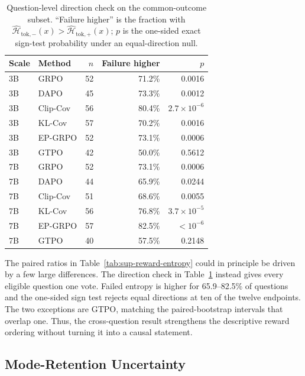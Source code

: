 \documentclass[letterpaper]{article}
\begin{document}
\begin{table}[t]
\centering
\scriptsize
\setlength{\tabcolsep}{3pt}
\begin{tabular*}{\columnwidth}{@{\extracolsep{\fill}}llrrr@{}}
\toprule
Scale & Method & \(n\) & Failure higher & \(p\)\\
\midrule
3B & GRPO     & 52 & 71.2\% & 0.0016\\
3B & DAPO     & 45 & 73.3\% & 0.0012\\
3B & Clip-Cov & 56 & 80.4\% & \(2.7{\times}10^{-6}\)\\
3B & KL-Cov   & 57 & 70.2\% & 0.0016\\
3B & EP-GRPO  & 52 & 73.1\% & 0.0006\\
3B & GTPO     & 42 & 50.0\% & 0.5612\\
\midrule
7B & GRPO     & 52 & 73.1\% & 0.0006\\
7B & DAPO     & 44 & 65.9\% & 0.0244\\
7B & Clip-Cov & 51 & 68.6\% & 0.0055\\
7B & KL-Cov   & 56 & 76.8\% & \(3.7{\times}10^{-5}\)\\
7B & EP-GRPO  & 57 & 82.5\% & \(<10^{-6}\)\\
7B & GTPO     & 40 & 57.5\% & 0.2148\\
\bottomrule
\end{tabular*}
\caption{Question-level direction check on the common-outcome subset.
``Failure higher'' is the fraction with
\(\widehat{\mathcal H}_{\mathrm{tok},-}(x)>
\widehat{\mathcal H}_{\mathrm{tok},+}(x)\); \(p\) is the one-sided exact
sign-test probability under an equal-direction null.}
\label{tab:sup-reward-sign}
\end{table}

The paired ratios in Table~\ref{tab:sup-reward-entropy} could in principle be
driven by a few large differences.  The direction check in
Table~\ref{tab:sup-reward-sign} instead gives every eligible question one
vote.  Failed entropy is higher for 65.9--82.5\% of questions and the
one-sided sign test rejects equal directions at ten of the twelve endpoints.
The two exceptions are GTPO, matching the paired-bootstrap intervals that
overlap one.  Thus, the cross-question result strengthens the descriptive
reward ordering without turning it into a causal statement.

\subsection{Mode-Retention Uncertainty}
\end{document}
